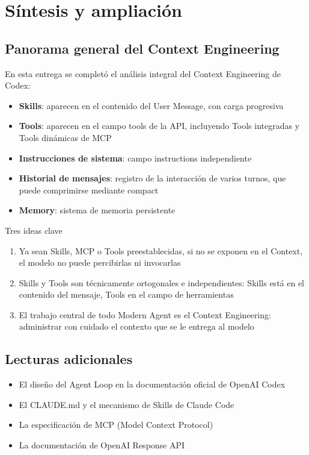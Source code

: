 \section{Síntesis y ampliación}

\subsection{Panorama general del Context Engineering}

En esta entrega se completó el análisis integral del Context Engineering de Codex:

\begin{itemize}
    \item \textbf{Skills}: aparecen en el contenido del User Message, con carga progresiva
    \item \textbf{Tools}: aparecen en el campo tools de la API, incluyendo Tools integradas y Tools dinámicas de MCP
    \item \textbf{Instrucciones de sistema}: campo instructions independiente
    \item \textbf{Historial de mensajes}: registro de la interacción de varios turnos, que puede comprimirse mediante compact
    \item \textbf{Memory}: sistema de memoria persistente
\end{itemize}

\begin{importantbox}{Tres ideas clave}
\begin{enumerate}
    \item Ya sean Skills, MCP o Tools preestablecidas, si no se exponen en el Context, el modelo no puede percibirlas ni invocarlas
    \item Skills y Tools son técnicamente ortogonales e independientes: Skills está en el contenido del mensaje, Tools en el campo de herramientas
    \item El trabajo central de todo Modern Agent es el Context Engineering: administrar con cuidado el contexto que se le entrega al modelo
\end{enumerate}
\end{importantbox}

\subsection{Lecturas adicionales}

\begin{itemize}
    \item El diseño del Agent Loop en la documentación oficial de OpenAI Codex
    \item El CLAUDE.md y el mecanismo de Skills de Claude Code
    \item La especificación de MCP (Model Context Protocol)
    \item La documentación de OpenAI Response API
\end{itemize}




